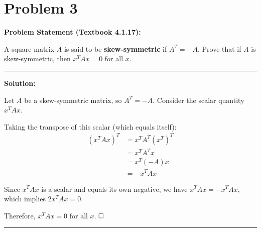 \clearpage
\section*{Problem 3}

\textbf{Problem Statement (Textbook 4.1.17):} 

A square matrix $A$ is said to be \textbf{skew-symmetric} if $A^T = -A$. Prove that if $A$ is skew-symmetric, then $x^T A x = 0$ for all $x$.

\noindent\rule{\textwidth}{0.4pt}

\vspace{1em}

\textbf{Solution:}

Let $A$ be a skew-symmetric matrix, so $A^T = -A$. Consider the scalar quantity $x^T A x$.

Taking the transpose of this scalar (which equals itself):
\begin{align*}
(x^T A x)^T &= x^T A^T (x^T)^T \\
&= x^T A^T x \\
&= x^T (-A) x \\
&= -x^T A x
\end{align*}

Since $x^T A x$ is a scalar and equals its own negative, we have $x^T A x = -x^T A x$, which implies $2x^T A x = 0$.

Therefore, $x^T A x = 0$ for all $x$. $\hfill \square$

\vspace{2em}
\noindent\rule{\textwidth}{0.4pt}
